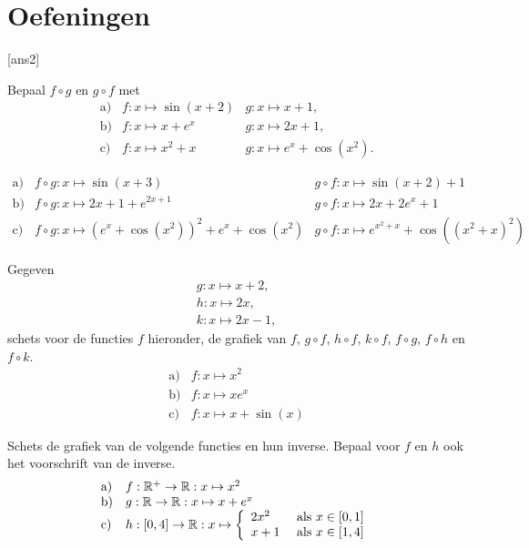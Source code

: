 \documentclass{ximera}
\begin{document}
\newpage

\section{Oefeningen}

[ans2]

\begin{oefening2}
Bepaal $f\circ g$ en $g\circ f$ met
\[
\begin{array}{lll}
\mbox{a)} & f:x\mapsto \sin(x+2) & g:x\mapsto x+1,\\
\mbox{b)} & f:x\mapsto x+e^x & g:x\mapsto 2x+1,\\
\mbox{c)} & f:x\mapsto x^2 + x & g:x\mapsto e^x + \cos(x^2).
\end{array}
\]

\begin{opl}
\[
\begin{array}{lll}
\mbox{a)} & f\circ g:x\mapsto \sin(x+3) & g\circ f:x\mapsto \sin(x+2)+1\\
\mbox{b)} & f\circ g:x\mapsto 2x+1+e^{2x+1} & g\circ f:x\mapsto 2x+2e^x+1\\
\mbox{c)} & f\circ g:x\mapsto (e^x+\cos(x^2))^2+e^x+\cos(x^2) & g\circ f:x\mapsto
e^{x^2+x}+\cos((x^2+x)^2)
\end{array}
\]
\end{opl}
\end{oefening2}

\begin{oefening2}
Gegeven
\[
\begin{array}{l}
g:x\mapsto x+2,\\
h:x\mapsto 2x,\\
k:x\mapsto 2x-1,
\end{array}
\]
schets voor de functies $f$ hieronder, de grafiek van $f$, $g\circ f$,
$h\circ f$, $k\circ f$, $f \circ g$, $f \circ h$ en $f\circ k$.
\[
\begin{array}{ll}
\mbox{a)} & f:x\mapsto x^2\\
\mbox{b)} & f:x\mapsto x e^{x}\\
\mbox{c)} & f:x\mapsto x+ \sin(x)
\end{array}
\]
\end{oefening2}

\begin{oefening2}
Schets de grafiek van de volgende functies en hun inverse. Bepaal voor
$f$ en $h$ ook het voorschrift van de inverse.
\[
\begin{array}{ll}
\mbox{a)} & f: \R^+ \rightarrow \R: x\mapsto x^2\\
\mbox{b)} & g: \R \rightarrow \R: x\mapsto x + e^x\\
\mbox{c)} & h: [0,4] \rightarrow \R: x\mapsto
 \left\{\ba{ll} 2 x^2 & \mbox{ als } x \in [0,1]\\
               x+1   & \mbox{ als } x \in [1,4]
       \ea\right.
\end{array}
\]
\end{oefening2}
\end{document}
